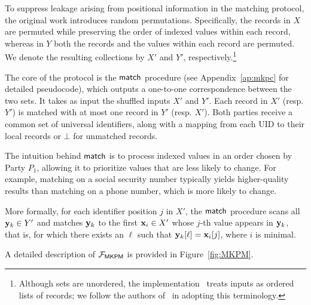 To suppress leakage arising from positional information in the matching
protocol, the original work \cite{MKPMC} introduces random
permutations. Specifically, the records in $X$ are permuted while preserving the
order of indexed values within each record, whereas in $Y$ both the records and
the values within each record are permuted. We denote the resulting collections
by $X'$ and $Y'$, respectively.\footnote{Although sets are unordered, the
  implementation~\cite{PIDRepo} treats inputs as ordered lists of records; we
  follow the authors of~\cite{MKPMC} in adopting this terminology.}

The core of the protocol is the $\mathsf{match}$ procedure (see Appendix~\ref{ap:mkpc}
for detailed pseudocode), which outputs a one-to-one correspondence between the
two sets. It takes as input the shuffled inputs $X'$ and $Y'$. Each record in
$X'$ (resp. $Y'$) is matched with at most one record in $Y'$ (resp. $X'$). Both
parties receive a common set of universal identifiers, along with a mapping from
each UID to their local records or $\bot$ for unmatched records.

The intuition behind $\mathsf{match}$ is to process indexed values in an order chosen by
Party $P_1$, allowing it to prioritize values that are less likely to
change. For example, matching on a social security number typically yields
higher-quality results than matching on a phone number, which is more likely to
change.

More formally, for each identifier position $j$ in $X'$, the $\mathsf{match}$ procedure
scans all $\mathbf{y}_k \in Y'$ and matches $\mathbf{y}_k$ to the first $\mathbf{x}_i \in X'$ whose
$j$-th value appears in $\mathbf{y}_k$, that is, for which there exists an $\ell$ such
that $\mathbf{y}_k[\ell] = \mathbf{x}_i[j]$, where $i$ is minimal.

A detailed description of $\mathcal{F}_{\mathsf{MKPM}}$ is provided in Figure~\ref{fig:MKPM}.


